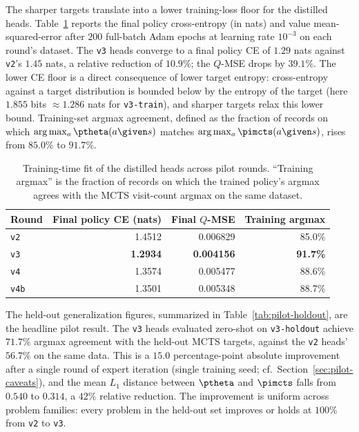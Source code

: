 The sharper targets translate into a lower training-loss floor for the
distilled heads. Table~\ref{tab:pilot-training} reports the final
policy cross-entropy (in nats) and value mean-squared-error after $200$
full-batch Adam epochs at learning rate $10^{-3}$ on each round's
dataset. The \texttt{v3} heads converge to a final policy CE of $1.29$
nats against \texttt{v2}'s $1.45$ nats, a relative reduction of $10.9\%$; the
$Q$-MSE drops by $39.1\%$. The lower CE floor is a direct consequence
of lower target entropy: cross-entropy against a target distribution
is bounded below by the entropy of the target (here $1.855$ bits
$\approx 1.286$ nats for \texttt{v3-train}), and sharper targets
relax this lower bound. Training-set argmax agreement, defined as the
fraction of records on which $\arg\max_a \ptheta(a \given s)$ matches
$\arg\max_a \pimcts(a \given s)$, rises from $85.0\%$ to $91.7\%$.

\begin{table}[t]
\centering
\caption{Training-time fit of the distilled heads across pilot rounds.
``Training argmax'' is the fraction of records on which the trained
policy's argmax agrees with the MCTS visit-count argmax on the same
dataset.}
\label{tab:pilot-training}
\small
\begin{tabular}{@{}lrrr@{}}
\toprule
Round & Final policy CE (nats) & Final $Q$-MSE & Training argmax \\
\midrule
\texttt{v2}   & 1.4512 & 0.006829 & 85.0\% \\
\texttt{v3}   & \textbf{1.2934} & \textbf{0.004156} & \textbf{91.7\%} \\
\texttt{v4}   & 1.3574 & 0.005477 & 88.6\% \\
\texttt{v4b}  & 1.3501 & 0.005348 & 88.7\% \\
\bottomrule
\end{tabular}
\end{table}

The held-out generalization figures, summarized in
Table~\ref{tab:pilot-holdout}, are the headline pilot result. The
\texttt{v3} heads evaluated zero-shot on \texttt{v3-holdout} achieve
$71.7\%$ argmax agreement with the held-out MCTS targets, against the
\texttt{v2} heads' $56.7\%$ on the same data. This is a $15.0$
percentage-point absolute improvement after a single round of expert
iteration (single training seed; cf.~Section~\ref{sec:pilot-caveats}),
and the mean $L_1$ distance between $\ptheta$ and $\pimcts$ falls
from $0.540$ to $0.314$, a $42\%$ relative reduction.
The improvement is uniform across problem families: every problem in
the held-out set improves or holds at $100\%$ from \texttt{v2} to
\texttt{v3}.

